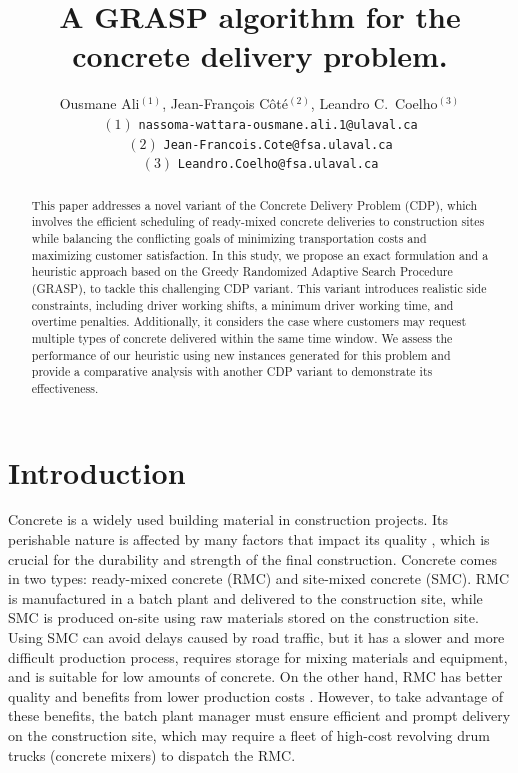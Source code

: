 \documentclass{article}
\title{A GRASP algorithm for the concrete delivery problem. }
\author{Ousmane Ali$^{(1)}$, Jean-Fran\c cois C\^ot\'e$^{(2)}$, Leandro C.~Coelho$^{(3)}$\\
 $(1)$ {\tt nassoma-wattara-ousmane.ali.1@ulaval.ca}\\
 $(2)$ {\tt Jean-Francois.Cote@fsa.ulaval.ca}\\
 $(3)$ {\tt Leandro.Coelho@fsa.ulaval.ca}\\
}
\begin{document}
\maketitle
\begin{abstract}
  This paper addresses a novel variant of the Concrete Delivery Problem (CDP), which involves the efficient scheduling of ready-mixed concrete deliveries to construction sites while balancing the conflicting goals of minimizing transportation costs and maximizing customer satisfaction. In this study, we propose an exact formulation and a heuristic approach based on the Greedy Randomized Adaptive Search Procedure (GRASP), to tackle this challenging CDP variant. This variant introduces realistic side constraints, including driver working shifts, a minimum driver working time, and overtime penalties. Additionally, it considers the case where customers may request multiple types of concrete delivered within the same time window. We assess the performance of our heuristic using new instances generated for this problem and provide a comparative analysis with another CDP variant to demonstrate its effectiveness.
\end{abstract}




\section{Introduction}
\label{sec:cdp_intro}
Concrete is a widely used building material in construction projects. Its perishable nature is affected by many factors that impact its quality \citep{sinha_quality_2021}, which is crucial for the durability and strength of the final construction. Concrete comes in two types: ready-mixed concrete (RMC) and site-mixed concrete (SMC). RMC is manufactured in a batch plant and delivered to the construction site, while SMC is produced on-site using raw materials stored on the construction site. Using SMC can avoid delays caused by road traffic, but it has a slower and more difficult production process, requires storage for mixing materials and equipment, and is suitable for low amounts of concrete. On the other hand, RMC has better quality and benefits from lower production costs \citep{muresan_comparing}. However, to take advantage of these benefits, the batch plant manager must ensure efficient and prompt delivery on the construction site, which may require a fleet of high-cost revolving drum trucks (concrete mixers) to dispatch the RMC.
\end{document}
